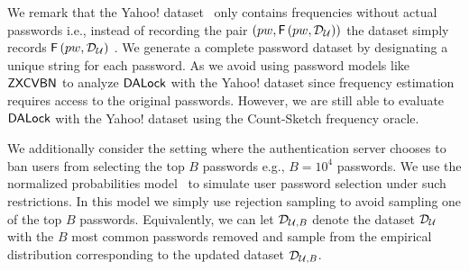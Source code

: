 We remark that the Yahoo! dataset~\cite{SP:Bonneau12,NDSS:BloDatBon16} only contains frequencies without actual passwords i.e., instead of recording the pair $(pw,  \mathsf{F}\left(pw, \mathcal{D}_{{\mathcal{U}}} \right))$ the dataset simply records $\mathsf{F}\left(pw, \mathcal{D}_{{\mathcal{U}}} \right)$ . We generate a complete password dataset by designating a unique string for each password. As we avoid using password models like $\mathsf{ZXCVBN}$ to analyze $\mathsf{DALock}$ with the Yahoo! dataset since frequency estimation requires access to the original passwords. However, we are still able to evaluate $\mathsf{DALock}$ with the Yahoo! dataset using the Count-Sketch frequency oracle. 

 We additionally consider the setting where the authentication server chooses to ban users from selecting the top $B$ passwords e.g., $B=10^4$ passwords. We use the normalized probabilities model~\cite{BKPS:ACMEC13} to simulate user password selection under such restrictions. In this model we simply use rejection sampling to avoid sampling one of the top $B$ passwords. Equivalently, we can let $\mathcal{D}_{{\mathcal{U}, B}}$ denote the dataset $\mathcal{D}_{{\mathcal{U}}}$ with the $B$ most common passwords removed and sample from the empirical distribution corresponding to the updated dataset $\mathcal{D}_{{\mathcal{U}, B}}$.





